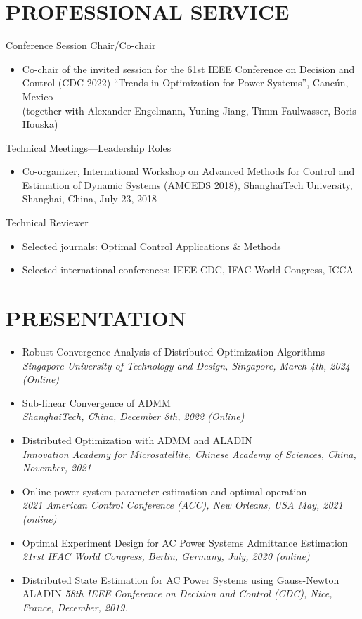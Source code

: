 \documentclass[paper=a4,fontsize=11pt]{scrartcl} %
\newcommand{\NewPart}[1]{\section*{\uppercase{#1}}}
\newcommand{\EducationEntry}[4]{
		\noindent \textbf{#1} \hfill      %
		\colorbox{White}{%
			\parbox{5cm}{%
			\hfill\color{Black}#2}} \par  %
		\noindent \textit{#3} \par        %
		\noindent\hangindent=2em\hangafter=0 \small #4 %
		\normalsize \par}
\begin{document}
\NewPart{Professional Service}{Conference Session Chair/Co-chair}
%
\begin{itemize}
	\item{Co-chair of the invited session for the 61st
		IEEE Conference on Decision and Control (CDC 2022)
		“Trends in Optimization for Power Systems”, Canc\'un, Mexico}\\
	(together with Alexander Engelmann, Yuning Jiang, Timm Faulwasser, Boris Houska)
	\end{itemize}
{Technical Meetings—Leadership Roles}
\begin{itemize}
\item{Co-organizer, International Workshop on Advanced Methods for Control and Estimation of Dynamic
	Systems (AMCEDS 2018), ShanghaiTech University, Shanghai, China, July 23, 2018}
\end{itemize}
{Technical Reviewer}
\begin{itemize}
	\item Selected journals: Optimal Control Applications $\&$ Methods
	\item Selected international conferences: IEEE CDC, IFAC World Congress, ICCA
\end{itemize}

\NewPart{PRESENTATION}{}
\begin{itemize}
		\item  {
		{Robust Convergence Analysis of Distributed Optimization Algorithms}\\
		\emph{Singapore University of Technology and Design, Singapore, March 4th, 2024 (Online)
	} }
	
		\item  {
		{Sub-linear Convergence of ADMM}\\
		\emph{ShanghaiTech, China, December 8th, 2022 (Online)
	} }
	
	\item  {
		{Distributed Optimization with ADMM and ALADIN}\\
		\emph{Innovation Academy for Microsatellite, Chinese Academy of Sciences, China,
			November, 2021
	} }
	
	\item  {
		{Online power system parameter estimation and optimal operation}\\
		\emph{2021 American Control Conference (ACC), New Orleans, USA May, 2021 (online)
	} }
	
	\item  {
		Optimal Experiment Design for AC Power Systems Admittance Estimation\\
		\emph{21rst IFAC World Congress, Berlin, Germany, July, 2020 (online)
	} }
	
	\item  {
		Distributed State Estimation for AC Power Systems using Gauss-Newton ALADIN 
		\emph{58th IEEE Conference on Decision and Control (CDC),
			Nice, France, December, 2019.} }
\end{itemize}
\end{document}
